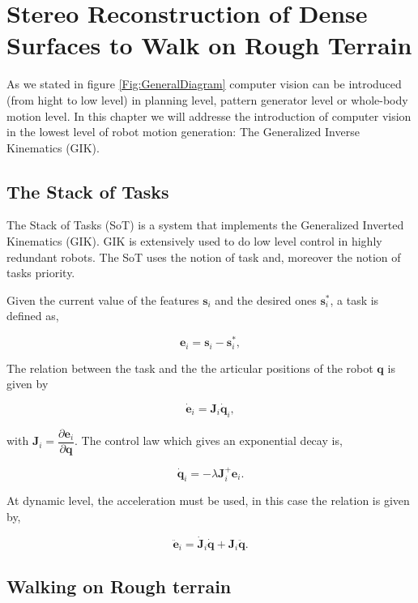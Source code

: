 \chapter{Stereo Reconstruction of Dense Surfaces to Walk on Rough Terrain} 
\label{Chap:3DReconstruction}

As we stated in figure \ref{Fig:GeneralDiagram} computer vision can be introduced (from hight to low level) in planning level, pattern generator level or whole-body motion level. In this chapter we will addresse the introduction of computer vision in the lowest level of robot motion generation: The Generalized Inverse Kinematics (GIK).

\section{The Stack of Tasks}

The Stack of Tasks (SoT) is a system that implements the Generalized Inverted Kinematics (GIK). GIK is extensively used to do low level control in highly redundant robots. The SoT uses the notion of task and, moreover the notion of tasks priority. 

Given the current value of the features $\mathbf{s}_i$ and the desired ones $\mathbf{s}^{*}_i$, a task is defined as,

$$
\mathbf{e}_i = \mathbf{s}_i - \mathbf{s}^{*}_i,
$$

The relation between the task and the the articular positions of the robot $\mathbf{q}$ is given by

$$
\dot{\mathbf{e}}_i = \mathbf{J}_i \dot{\mathbf{q}}_i,
$$

with $\mathbf{J}_i = \dfrac{\partial \mathbf{e}_i}{\partial \mathbf{q}} $. The control law which gives an exponential decay is,

$$
\dot{\mathbf{q}}_i = - \lambda \mathbf{J}^{+}_i \mathbf{e}_i.
$$

At dynamic level, the acceleration must be used, in this case the relation is given by,

$$
\ddot{\mathbf{e}}_i = \dot{\mathbf{J}}_i \dot{\mathbf{q}} + \mathbf{J}_i \ddot{\mathbf{q}}.
$$

\section{Walking on Rough terrain}

